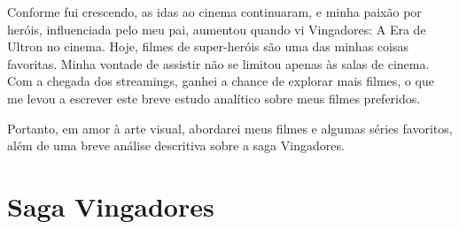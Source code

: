 \documentclass[
    12pt,                  %
    openright,             %
    oneside,               %
    a4paper,               %
    chapter=TITLE,         %
    section=TITLE,         %
    brazil                 %
]{abntex2}                 %
\begin{document}
\noindent Conforme fui crescendo, as idas ao cinema continuaram, e minha paixão por heróis, influenciada pelo meu pai, aumentou quando vi Vingadores: A Era de Ultron no cinema. Hoje, filmes de super-heróis são uma das minhas coisas favoritas. Minha vontade de assistir não se limitou apenas às salas de cinema. Com a chegada dos streamings, ganhei a chance de explorar mais filmes, o que me levou a escrever este breve estudo analítico sobre meus filmes preferidos.\\ \vspace{0.1px}

\noindent Portanto, em amor à arte visual, abordarei meus filmes e algumas séries favoritos, além de uma breve análise descritiva sobre a saga Vingadores.


\chapter*{Saga Vingadores}
\end{document}
